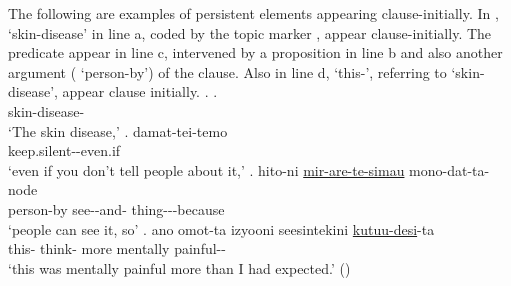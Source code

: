 The following are examples of persistent elements appearing clause-initially.
In \Next,
 `skin-disease' in line a, coded by the topic marker ,
appear clause-initially.
The predicate appear in line c,
intervened by a proposition in line b and also another argument ( `person-by') of the clause.
Also in line d,  `this-', referring to `skin-disease', appear clause initially.
%
\ex.
 \ag.  \\
 		skin-disease- \\
		`The skin disease,'
 \bg. damat-tei-temo \\
 		keep.silent--even.if \\
		`even if you don't tell people about it,'
 \bg. hito-ni \ul{mir-are-te-simau} mono-dat-ta-node \\
 		person-by see--and- thing---because \\
		`people can see it, so'
 \bg.  ano omot-ta izyooni seesintekini \ul{kutuu-desi}-ta \\
 		this-  think- more mentally painful-- \\
		`this was mentally painful more than I had expected.'
		\hfill{()}

